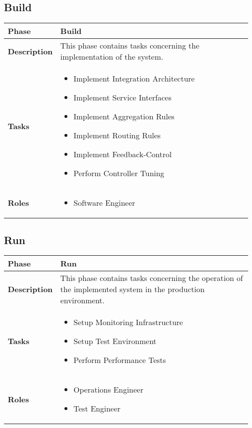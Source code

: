 \subsection{Build}
\begin{tabularx}{\textwidth}{@{} l X @{}}
	\caption{Phase: Build}\label{table:ch6_View_Build}\\
	\toprule
	\bfseries Phase & Build\\
	\midrule 
	\bfseries Description & This phase contains tasks concerning the implementation of the system.\\
	\midrule 
	\bfseries Tasks & 
	\begin{itemize}
		\item Implement Integration Architecture
		\item Implement Service Interfaces
		\item Implement Aggregation Rules
		\item Implement Routing Rules
		\item Implement Feedback-Control	
		\item Perform Controller Tuning
	\end{itemize}
	\\
	\midrule
	\bfseries Roles &
	\begin{itemize}
		\item Software Engineer
	\end{itemize}
	\\
	\bottomrule
\end{tabularx}


\subsection{Run}
\begin{tabularx}{\textwidth}{@{} l X @{}}
	\caption{Phase: Run}\label{table:ch6_View_Run}\\
	\toprule
	\bfseries Phase & Run\\
	\midrule 
	\bfseries Description & This phase contains tasks concerning the operation of the implemented system in the production environment. \\
	\midrule 
	\bfseries Tasks & 
	\begin{itemize}
		\item Setup Monitoring Infrastructure
		\item Setup Test Environment
		\item Perform Performance Tests
	\end{itemize}
	\\
	\midrule 
	\bfseries Roles &
	\begin{itemize}
		\item Operations Engineer
		\item Test Engineer
	\end{itemize}
	\\
	\bottomrule 
\end{tabularx}

